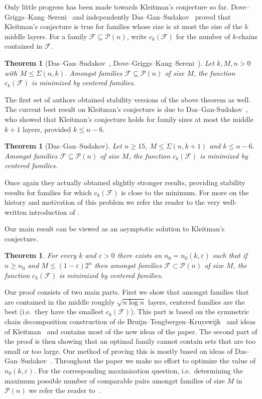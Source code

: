 \documentclass[12pt]{article}
\newtheorem{thm}[theorem]{Theorem}
\numberwithin{equation}{section}
\def\F{\mathcal{F}}
\def\P{\mathcal{P}}
\def\eps{\varepsilon}
\begin{document}
Only little progress has been made towards Kleitman's conjecture so far. Dove--Griggs--Kang--Sereni~\cite{griggs} and independently Das--Gan--Sudakov~\cite{dasgansuda} proved that Kleitman's conjecture is true for families whose size is at most the size of the $k$ middle layers. For a family $\F\subseteq \P(n)$, write $c_k(\F)$ for the number of $k$-chains contained in $\F$.
\begin{thm}[Das--Gan--Sudakov~\cite{dasgansuda}, Dove--Griggs--Kang--Sereni~\cite{griggs}]
Let $k,M,n>0$ with $M\leq \Sigma(n,k)$. Amongst families $\F\subseteq \P(n)$ of size $M$, the function $c_k(\F)$ is minimized by centered families.
\end{thm}
The first set of authors obtained stability versions of the above theorem as well. The current best result on Kleitman's conjecture is due to Das--Gan-Sudakov~\cite{dasgansuda}, who showed that Kleitman's conjecture holds for family sizes at most the middle $k+1$ layers, provided $k\leq n-6$.
\begin{thm}[\label{dasgansudakovthm}Das--Gan--Sudakov]
Let $n\geq 15$, $M\leq \Sigma(n,k+1)$ and $k\leq n-6$. Amongst families $\F\subseteq \P(n)$ of size $M$, the function $c_k(\F)$ is minimized by centered families.
\end{thm}
Once again they actually obtained slightly stronger results, providing stability results for families for which $c_k(\F)$ is close to the minimum. For more on the history and motivation of this problem we refer the reader to the very well-written introduction of \cite{dasgansuda}. 

Our main result can be viewed as an asymptotic solution to Kleitman's conjecture.
\begin{thm}\label{mainthm}
For every $k$ and $\eps>0$ there exists an $n_0=n_0(k,\eps)$ such that if $n\geq n_0$ and $M\leq (1-\eps)2^n$ then amongst families $\F\subset \P(n)$ of size $M$,  the function $c_k(\F)$ is minimized by centered families.
\end{thm}
Our proof consists of two main parts. First we show that amongst families that are contained in the middle roughly $\sqrt{n\log n}$ layers, centered families are the best (i.e.~they have the smallest $c_k(\F)$). This part is based on the symmetric chain decomposition construction of de Bruijn--Tengbergen--Kruyswijk~\cite{scd} and ideas of Kleitman~\cite{kleitmanpermu} and contains most of the new ideas of the paper. The second part of the proof is then showing that an optimal family cannot contain sets that are too small or too large. Our method of proving this is mostly based on ideas of Das--Gan--Sudakov~\cite{dasgansuda}. Throughout the paper we make no effort to optimize the value of $n_0(k,\eps)$. For the corresponding maximisation question, i.e.~determining the maximum possible number of comparable pairs amongst families of size $M$ in $\P(n)$ we refer the reader to~\cite{alonmaxim}.
\end{document}
